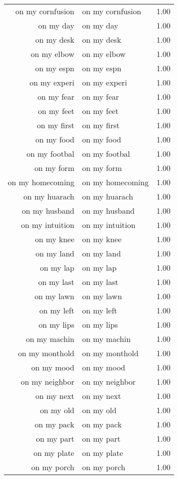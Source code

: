 \begin{table}[ht]
\begin{tabular}{rlr}
  on my cornfusion & on my cornfusion & 1.00 \\ 
  on my day & on my day & 1.00 \\ 
  on my desk & on my desk & 1.00 \\ 
  on my elbow & on my elbow & 1.00 \\ 
  on my espn & on my espn & 1.00 \\ 
  on my experi & on my experi & 1.00 \\ 
  on my fear & on my fear & 1.00 \\ 
  on my feet & on my feet & 1.00 \\ 
  on my first & on my first & 1.00 \\ 
  on my food & on my food & 1.00 \\ 
  on my footbal & on my footbal & 1.00 \\ 
  on my form & on my form & 1.00 \\ 
  on my homecoming & on my homecoming & 1.00 \\ 
  on my huarach & on my huarach & 1.00 \\ 
  on my husband & on my husband & 1.00 \\ 
  on my intuition & on my intuition & 1.00 \\ 
  on my knee & on my knee & 1.00 \\ 
  on my land & on my land & 1.00 \\ 
  on my lap & on my lap & 1.00 \\ 
  on my last & on my last & 1.00 \\ 
  on my lawn & on my lawn & 1.00 \\ 
  on my left & on my left & 1.00 \\ 
  on my lips & on my lips & 1.00 \\ 
  on my machin & on my machin & 1.00 \\ 
  on my monthold & on my monthold & 1.00 \\ 
  on my mood & on my mood & 1.00 \\ 
  on my neighbor & on my neighbor & 1.00 \\ 
  on my next & on my next & 1.00 \\ 
  on my old & on my old & 1.00 \\ 
  on my pack & on my pack & 1.00 \\ 
  on my part & on my part & 1.00 \\ 
  on my plate & on my plate & 1.00 \\ 
  on my porch & on my porch & 1.00 \\ 

\end{tabular}
\end{table}
